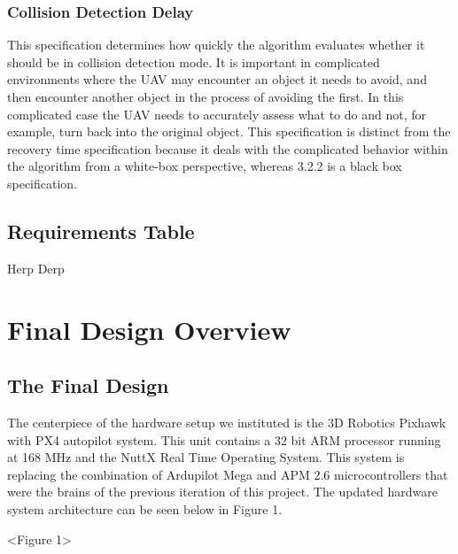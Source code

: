\documentclass[12pt]{article}
\begin{document}
\subsubsection{Collision Detection Delay}
This specification determines how quickly the algorithm evaluates whether it should be in collision detection mode. It is important in complicated environments where the UAV may encounter an object it needs to avoid, and then encounter another object in the process of avoiding the first. In this complicated case the UAV needs to accurately assess what to do and not, for example, turn back into the original object. This specification is distinct from the recovery time specification because it deals with the complicated behavior within the algorithm from a white-box perspective, whereas 3.2.2 is a black box specification.

\subsection{Requirements Table}
Herp Derp

\section{Final Design Overview}
\subsection{The Final Design}
The centerpiece of the hardware setup we instituted is the 3D Robotics Pixhawk with PX4 autopilot system. This unit contains a 32 bit ARM processor running at 168 MHz and the NuttX Real Time Operating System. This system is replacing the combination of Ardupilot Mega and APM 2.6 microcontrollers that were the brains of the previous iteration of this project. The updated hardware system architecture can be seen below in Figure 1.

<Figure 1>
\end{document}
